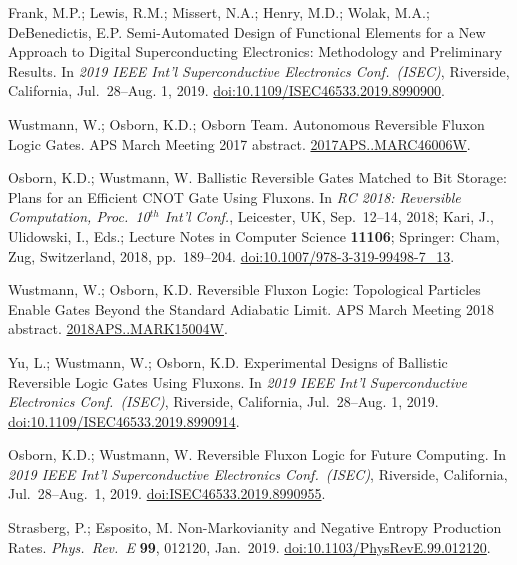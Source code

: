 \documentclass[preprints,article,accept,moreauthors,pdftex]{Definitions/mdpi}
\begin{document}
\begin{thebibliography}{999}
Frank, M.P.; Lewis, R.M.; Missert, N.A.; Henry, M.D.; Wolak, M.A.; DeBenedictis, E.P\@. Semi-Automated Design of Functional Elements for a New Approach to Digital Superconducting Electronics: Methodology and Preliminary Results. In \emph{2019 IEEE Int'l Superconductive Electronics Conf.\ (ISEC)}, Riverside, California, Jul.\ 28--Aug. 1, 2019. \href{https://doi.org/10.1109/ISEC46533.2019.8990900}{doi:10.1109/ISEC46533.2019.8990900}.

Wustmann, W.; Osborn, K.D.; Osborn Team. Autonomous Reversible Fluxon Logic Gates. APS March Meeting 2017 abstract. \href{https://ui.adsabs.harvard.edu/#abs/2017APS..MARC46006W/abstract}{2017APS..MARC46006W}.

Osborn, K.D.; Wustmann, W\@. Ballistic Reversible Gates Matched to Bit Storage: Plans for an Efficient CNOT Gate Using Fluxons. In \emph{RC 2018: Reversible Computation, Proc.\ 10$^{th}$ Int'l Conf.}, Leicester, UK, Sep.\ 12--14, 2018; Kari, J., Ulidowski, I., Eds.; Lecture Notes in Computer Science {\bf 11106}; Springer: Cham, Zug, Switzerland, 2018, pp.~189--204. \href{https://doi.org/10.1007/978-3-319-99498-7_13}{doi:10.1007/978-3-319-99498-7\_13}.

Wustmann, W.; Osborn, K.D\@. Reversible Fluxon Logic: Topological Particles Enable Gates Beyond the Standard Adiabatic Limit. APS March Meeting 2018 abstract. \href{https://ui.adsabs.harvard.edu/#abs/2018APS..MARK15004W/abstract}{2018APS..MARK15004W}.

Yu, L.; Wustmann, W.; Osborn, K.D\@. Experimental Designs of Ballistic Reversible Logic Gates Using Fluxons.  In \emph{2019 IEEE Int'l Superconductive Electronics Conf.\ (ISEC)}, Riverside, California, Jul.\ 28--Aug. 1, 2019. \href{https://doi.org/10.1109/ISEC46533.2019.8990914}{doi:10.1109/ISEC46533.2019.8990914}.

Osborn, K.D.; Wustmann, W\@. Reversible Fluxon Logic for Future Computing. In \emph{2019 IEEE Int'l Superconductive Electronics Conf.\ (ISEC)}, Riverside, California, Jul.\ 28--Aug.\ 1, 2019. \href{https://doi.org/10.1109/ISEC46533.2019.8990955}{doi:ISEC46533.2019.8990955}.

Strasberg, P.; Esposito, M\@. Non-Markovianity and Negative Entropy Production Rates. {\em Phys.\ Rev.\ E} {\bf 99}, 012120, Jan.\ 2019. \href{https://doi.org/10.1103/PhysRevE.99.012120}{doi:10.1103/PhysRevE.99.012120}.


\end{thebibliography}
\end{document}
